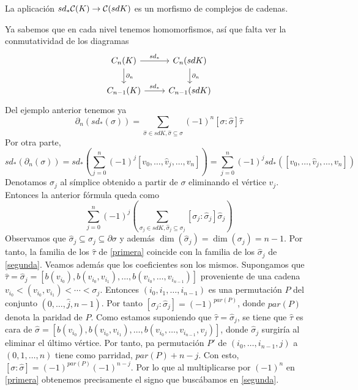 \documentclass[HS.tex]{subfiles}
\begin{document}
\begin{prop}
La aplicación $sd_*\mathcal{C}(K)\to\mathcal{C}(sdK)$ es un morfismo de complejos de cadenas.
\end{prop}
\begin{dem}
Ya sabemos que en cada nivel tenemos homomorfismos, así que falta ver la conmutatividad de los diagramas
\[
\begin{tikzcd}
C_n(K)\arrow[r,"sd_*"]\arrow[d, "\partial_n"] & C_n(sdK)\arrow[d, "\partial_n"]\\
C_{n-1}(K)\arrow[r, "sd_*"] & C_{n-1}(sdK)
\end{tikzcd}
\]
Del ejemplo anterior tenemos ya 
\begin{equation}\label{primera}
\partial_n(sd_*(\sigma))=\sum_{\hat{\sigma}\in sdK,\hat{\sigma}\subseteq\sigma}(-1)^n[\sigma:\hat{\sigma}]\hat{\tau}
\end{equation}
Por otra parte, 
\[
sd_*(\partial_n(\sigma))=sd_*\left(\sum_{j=0}^n(-1)^j[v_0,\dots, \hat{v}_j, \dots, v_n]\right)=\sum_{j=0}^n(-1)^jsd_*([v_0,\dots, \hat{v}_j, \dots, v_n])
\]
Denotamos $\sigma_j$ al símplice obtenido a partir de $\sigma$ eliminando el vértice $v_j$. Entonces la anterior fórmula queda como
\begin{equation}\label{segunda}
\sum_{j=0}^n(-1)^j\left(\sum_{\sigma_j\in sdK,\hat{\sigma}_j\subseteq\sigma_j}[\sigma_j:\hat{\sigma}_j]\hat{\sigma}_j\right)
\end{equation}
Observamos que $\hat{\sigma}_j\subseteq\sigma_j\subseteq\partial\sigma$ y además $\dim(\hat{\sigma}_j)=\dim(\sigma_j)=n-1$. Por tanto, la familia de los $\hat{\tau}$ de \ref{primera} coincide con la familia de los $\hat{\sigma}_j$ de \ref{segunda}. Veamos además que los coeficientes son los mismos. Supongamos que $\hat{\tau}=\hat{\sigma}_j=[b(v_{i_0}),b(v_{i_0}, v_{i_1}), \dots, b(v_{i_0},\dots, v_{i_{n-1}})]$ proveniente de una cadena $v_{i_0}<(v_{i_0}, v_{i_1})<\cdots<\sigma_j$. Entonces $(i_0,i_1,\dots, i_{n-1})$ es una permutación $P$ del conjunto $(0,\dots, \hat{j}, n-1)$. Por tanto $[\sigma_j:\hat{\sigma}_j]=(-1)^{par(P)}$, donde $par(P)$ denota la paridad de $P$. Como estamos suponiendo que $\hat{\tau}=\hat{\sigma}_j$, se tiene que $\hat{\tau}$ es cara de $\hat{\sigma}=[b(v_{i_0}),b(v_{i_0}, v_{i_1}), \dots, b(v_{i_0},\dots, v_{i_{n-1}}, v_j)]$, donde $\hat{\sigma}_j$ surgiría al eliminar el último vértice. Por tanto, pa permutación $P'$ de $(i_0,\dots, i_{n-1}, j)$ a $(0,1,\dots, n)$ tiene como parridad, $par(P)+n-j$. Con esto, $[\sigma:\hat{\sigma}]=(-1)^{par(P)}(-1)^{n-j}$. Por lo que al multiplicarse por $(-1)^n$ en \ref{primera} obtenemos precisamente el signo que buscábamos en \ref{segunda}. 
\QED
\end{dem}
\end{document}
